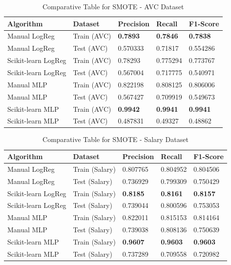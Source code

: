 \documentclass[a4paper,12pt]{article}
\begin{document}
\begin{table}[h!]
    \centering
    \caption{Comparative Table for SMOTE - AVC Dataset}
    \begin{tabularx}{\textwidth}{|l|l|X|X|X|}
    \hline
    \textbf{Algorithm} & \textbf{Dataset} & \textbf{Precision} & \textbf{Recall} & \textbf{F1-Score} \\
    \hline
    Manual LogReg & Train (AVC) & \textbf{0.7893} & \textbf{0.7846} & \textbf{0.7838} \\
    Manual LogReg & Test (AVC) & 0.570333 & 0.71817 & 0.554286 \\
    Scikit-learn LogReg & Train (AVC) & 0.78293 & 0.775294 & 0.773767 \\
    Scikit-learn LogReg & Test (AVC) & 0.567004 & 0.717775 & 0.540971 \\
    Manual MLP & Train (AVC) & 0.822198 & 0.808125 & 0.806006 \\
    Manual MLP & Test (AVC) & 0.567427 & 0.709919 & 0.549673 \\
    Scikit-learn MLP & Train (AVC) & \textbf{0.9942} & \textbf{0.9941} & \textbf{0.9941} \\
    Scikit-learn MLP & Test (AVC) & 0.487831 & 0.49327 & 0.48862 \\
    \hline
    \end{tabularx}
\end{table}

\begin{table}[h!]
    \centering
    \caption{Comparative Table for SMOTE - Salary Dataset}
    \begin{tabularx}{\textwidth}{|l|l|X|X|X|}
    \hline
    \textbf{Algorithm} & \textbf{Dataset} & \textbf{Precision} & \textbf{Recall} & \textbf{F1-Score} \\
    \hline
    Manual LogReg & Train (Salary) & 0.807765 & 0.804952 & 0.804506 \\
    Manual LogReg & Test (Salary) & 0.736929 & 0.799309 & 0.750429 \\
    Scikit-learn LogReg & Train (Salary) & \textbf{0.8185} & \textbf{0.8161} & \textbf{0.8157} \\
    Scikit-learn LogReg & Test (Salary) & 0.739044 & 0.800596 & 0.753053 \\
    Manual MLP & Train (Salary) & 0.822011 & 0.815153 & 0.814164 \\
    Manual MLP & Test (Salary) & 0.739038 & 0.808136 & 0.750639 \\
    Scikit-learn MLP & Train (Salary) & \textbf{0.9607} & \textbf{0.9603} & \textbf{0.9603} \\
    Scikit-learn MLP & Test (Salary) & 0.737289 & 0.709558 & 0.720982 \\
    \hline
    \end{tabularx}
\end{table}
\end{document}
